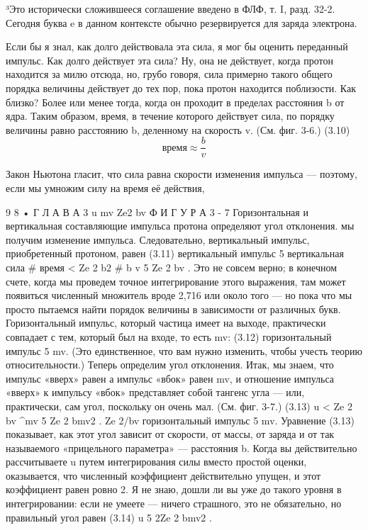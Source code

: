 \documentclass[10pt,oneside]{article}
\begin{document}
³Это исторически сложившееся соглашение введено в ФЛФ, т. I, разд. 32-2. Сегодня буква e в данном контексте обычно резервируется для заряда электрона.\par

Если бы я знал, как долго действовала эта сила, я мог бы оценить переданный импульс. Как долго действует эта сила? Ну, она не действует, когда протон находится за милю отсюда, но, грубо говоря, сила примерно такого общего порядка величины действует до тех пор, пока протон находится поблизости. Как близко? Более или менее тогда, когда он проходит в пределах расстояния b от ядра. Таким образом, время, в течение которого действует сила, по порядку величины равно расстоянию b, деленному на скорость v. (См. фиг. 3-6.) (3.10) \[\text{время} \approx \frac{b}{v}\]\par

Закон Ньютона гласит, что сила равна скорости изменения импульса --- поэтому, если мы умножим силу на время её действия,\par

9 8 • Г Л А В А  3 u mv Ze2 bv Ф И Г У Р А  3 - 7 Горизонтальная и вертикальная составляющие импульса протона определяют угол отклонения. мы получим изменение импульса. Следовательно, вертикальный импульс, приобретенный протоном, равен (3.11) вертикальный импульс 5 вертикальная сила \# время < Ze 2 b2 \# b v 5 Ze 2 bv . Это не совсем верно; в конечном счете, когда мы проведем точное интегрирование этого выражения, там может появиться численный множитель вроде 2,716 или около того --- но пока что мы просто пытаемся найти порядок величины в зависимости от различных букв. Горизонтальный импульс, который частица имеет на выходе, практически совпадает с тем, который был на входе, то есть mv: (3.12) горизонтальный импульс 5 mv. (Это единственное, что вам нужно изменить, чтобы учесть теорию относительности.) Теперь определим угол отклонения. Итак, мы знаем, что импульс «вверх» равен а импульс «вбок» равен mv, и отношение импульса «вверх» к импульсу «вбок» представляет собой тангенс угла --- или, практически, сам угол, поскольку он очень мал. (См. фиг. 3-7.) (3.13) u < Ze 2 bv \textasciicircum{}mv 5 Ze 2 bmv2 . Ze 2/bv горизонтальный импульс 5 mv. Уравнение (3.13) показывает, как этот угол зависит от скорости, от массы, от заряда и от так называемого «прицельного параметра» --- расстояния b. Когда вы действительно рассчитываете u путем интегрирования силы вместо простой оценки, оказывается, что численный коэффициент действительно упущен, и этот коэффициент равен ровно 2. Я не знаю, дошли ли вы уже до такого уровня в интегрировании: если не умеете --- ничего страшного, это не обязательно, но правильный угол равен (3.14) u 5 2Ze 2 bmv2 .\par
\end{document}
